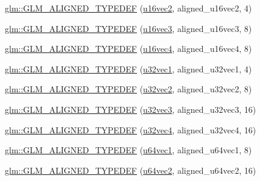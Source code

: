 \begin{DoxyCompactItemize}
\hyperlink{group__gtx__type__aligned_gac01bb9fc32a1cd76c2b80d030f71df4c}{glm\+::\+G\+L\+M\+\_\+\+A\+L\+I\+G\+N\+E\+D\+\_\+\+T\+Y\+P\+E\+D\+EF} (\hyperlink{group__gtc__type__precision_ga50bd2ceeb100a187e7c46f135269a0ec}{u16vec2}, aligned\+\_\+u16vec2, 4)
\item 
\hyperlink{group__gtx__type__aligned_ga09540dbca093793a36a8997e0d4bee77}{glm\+::\+G\+L\+M\+\_\+\+A\+L\+I\+G\+N\+E\+D\+\_\+\+T\+Y\+P\+E\+D\+EF} (\hyperlink{group__gtc__type__precision_gad60f14d1abd39b480cbe5c5cf848071a}{u16vec3}, aligned\+\_\+u16vec3, 8)
\item 
\hyperlink{group__gtx__type__aligned_gaecafb5996f5a44f57e34d29c8670741e}{glm\+::\+G\+L\+M\+\_\+\+A\+L\+I\+G\+N\+E\+D\+\_\+\+T\+Y\+P\+E\+D\+EF} (\hyperlink{group__gtc__type__precision_ga049d45ad8d0f78578d7ceb86a7fdaae4}{u16vec4}, aligned\+\_\+u16vec4, 8)
\item 
\hyperlink{group__gtx__type__aligned_gac6b161a04d2f8408fe1c9d857e8daac0}{glm\+::\+G\+L\+M\+\_\+\+A\+L\+I\+G\+N\+E\+D\+\_\+\+T\+Y\+P\+E\+D\+EF} (\hyperlink{group__gtc__type__precision_ga99f64714ce341e34036bd10c8b36823a}{u32vec1}, aligned\+\_\+u32vec1, 4)
\item 
\hyperlink{group__gtx__type__aligned_ga1fa0dfc8feb0fa17dab2acd43e05342b}{glm\+::\+G\+L\+M\+\_\+\+A\+L\+I\+G\+N\+E\+D\+\_\+\+T\+Y\+P\+E\+D\+EF} (\hyperlink{group__gtc__type__precision_gad854a1005ce84d8f6e8f05e42893f5c9}{u32vec2}, aligned\+\_\+u32vec2, 8)
\item 
\hyperlink{group__gtx__type__aligned_ga0019500abbfa9c66eff61ca75eaaed94}{glm\+::\+G\+L\+M\+\_\+\+A\+L\+I\+G\+N\+E\+D\+\_\+\+T\+Y\+P\+E\+D\+EF} (\hyperlink{group__gtc__type__precision_ga342e504c37b635393e6747b85147151f}{u32vec3}, aligned\+\_\+u32vec3, 16)
\item 
\hyperlink{group__gtx__type__aligned_ga14fd29d01dae7b08a04e9facbcc18824}{glm\+::\+G\+L\+M\+\_\+\+A\+L\+I\+G\+N\+E\+D\+\_\+\+T\+Y\+P\+E\+D\+EF} (\hyperlink{group__gtc__type__precision_gad3f72b91c5b7efbc377625c44433824d}{u32vec4}, aligned\+\_\+u32vec4, 16)
\item 
\hyperlink{group__gtx__type__aligned_gab253845f534a67136f9619843cade903}{glm\+::\+G\+L\+M\+\_\+\+A\+L\+I\+G\+N\+E\+D\+\_\+\+T\+Y\+P\+E\+D\+EF} (\hyperlink{group__gtc__type__precision_gaf01aa7972f78cabc61558a0171d78a01}{u64vec1}, aligned\+\_\+u64vec1, 8)
\item 
\hyperlink{group__gtx__type__aligned_ga929427a7627940cdf3304f9c050b677d}{glm\+::\+G\+L\+M\+\_\+\+A\+L\+I\+G\+N\+E\+D\+\_\+\+T\+Y\+P\+E\+D\+EF} (\hyperlink{group__gtc__type__precision_ga989179a9ae798526e8bac59fb21678b7}{u64vec2}, aligned\+\_\+u64vec2, 16)

\end{DoxyCompactItemize}
